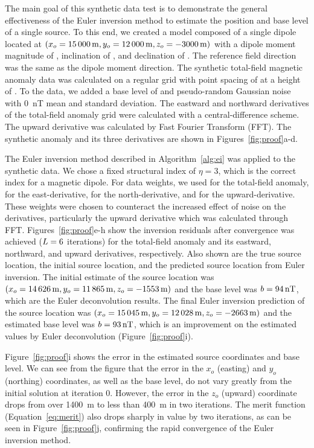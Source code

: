 The main goal of this synthetic data test is to demonstrate the general effectiveness of the Euler inversion method to estimate the position and base level of a single source.
To this end, we created a model composed of a single dipole located at
$(x_o = \SynProofTrueEast, y_o = \SynProofTrueNorth, z_o = \SynProofTrueUp)$
with a dipole moment magnitude of \SynProofInt{}, inclination of \SynProofInc{}, and declination of \SynProofDec{}.
The reference field direction was the same as the dipole moment direction.
The synthetic total-field magnetic anomaly data was calculated on a regular grid
with point spacing of \SynProofSpacing{} at a height of \SynProofHeight{}.
To the data, we added a base level of \SynProofTrueBase{} and
pseudo-random Gaussian noise with \qty{0}{\nano\tesla} mean and \SynProofNoise{} standard deviation.
The eastward and northward derivatives of the total-field anomaly grid were calculated with a central-difference scheme.
The upward derivative was calculated by Fast Fourier Transform (FFT).
The synthetic anomaly and its three derivatives are shown in Figures~\ref{fig:proof}a-d.

The Euler inversion method described in Algorithm~\ref{alg:ei} was applied to the synthetic data.
We chose a fixed structural index of $\eta=3$, which is the correct index for a magnetic dipole.
For data weights, we used \DefaultWeightsF{} for the total-field anomaly, \DefaultWeightsE{} for the east-derivative, \DefaultWeightsN{} for the north-derivative, and \DefaultWeightsU{} for the upward-derivative.
These weights were chosen to counteract the increased effect of noise on the derivatives, particularly the upward derivative which was calculated through FFT.
Figures~\ref{fig:proof}e-h show the inversion residuals after convergence was achieved ($L=6{}$ iterations) for the total-field anomaly and its eastward, northward, and upward derivatives, respectively.
Also shown are the true source location, the initial source location, and the predicted source location from Euler inversion.
The initial estimate of the source location was $(x_o=\SynProofEDEast,
y_o=\SynProofEDNorth, z_o=\SynProofEDUp)$ and the base level was $b
= \qty{94}{\nano\tesla}$, which are the Euler deconvolution results.
The final Euler inversion prediction of the source location was
$(x_o=\SynProofEstEast, y_o=\SynProofEstNorth, z_o=\SynProofEstUp)$ and the
estimated base level was $b = \qty{93}{\nano\tesla}$, which is an improvement on the
estimated values by Euler deconvolution (Figure~\ref{fig:proof}i).

Figure~\ref{fig:proof}i shows the error in the estimated source coordinates and base level.
We can see from the figure that the error in the $x_o$ (easting) and $y_o$
(northing) coordinates, as well as the base level, do not vary greatly from the
initial solution at iteration 0.
However, the error in the $z_o$ (upward) coordinate drops from over \qty{1400}{\m} to less than \qty{400}{\m} in two iterations.
The merit function (Equation~\ref{eq:merit}) also drops sharply in value by two iterations, as can be seen in Figure~\ref{fig:proof}j, confirming the rapid convergence of the Euler inversion method.


